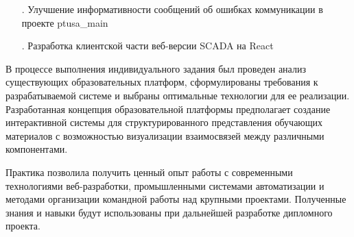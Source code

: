 {\begin{itemize}[leftmargin=2.15cm, labelwidth=0.65cm, labelsep=0.0cm]
\item[\theitemcntr.] Улучшение информативности сообщений об ошибках коммуникации в проекте ptusa\_main
\addtocounter{itemcntr}{1}

\item[\theitemcntr.] Разработка клиентской части веб-версии SCADA на React
\addtocounter{itemcntr}{1}

\setcounter{itemcntr}{1}
\end{itemize}

\par \redline В процессе выполнения индивидуального задания был проведен анализ существующих образовательных платформ, сформулированы требования к разрабатываемой системе и выбраны оптимальные технологии для ее реализации. Разработанная концепция образовательной платформы предполагает создание интерактивной системы для структурированного представления обучающих материалов с возможностью визуализации взаимосвязей между различными компонентами.

\par \redline Практика позволила получить ценный опыт работы с современными технологиями веб-разработки, промышленными системами автоматизации и методами организации командной работы над крупными проектами. Полученные знания и навыки будут использованы при дальнейшей разработке дипломного проекта.

}
